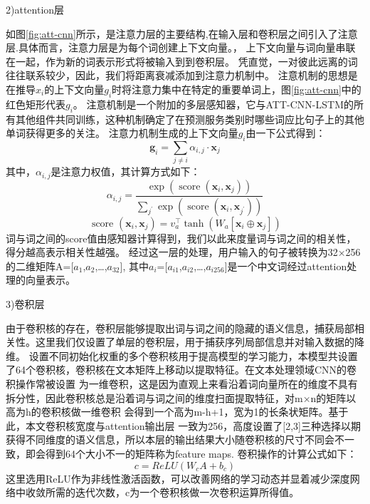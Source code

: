   2)attention层

  如图\ref{fig:att-cnn}所示，是注意力层的主要结构,在输入层和卷积层之间引入了注意层.具体而言，注意力层是为每个词创建上下文向量。，
  上下文向量与词向量串联在一起，作为新的词表示形式将被输入到到卷积层。 凭直觉，一对彼此远离的词往往联系较少，因此，我们将距离衰减添加到注意力机制中。 
  注意机制的思想是在推导$x_{i}$的上下文向量$g_{i}$时将注意力集中在特定的重要单词上，图\ref{fig:att-cnn}中的红色矩形代表$g_{i}$。 
  注意机制是一个附加的多层感知器，它与ATT-CNN-LSTM的所有其他组件共同训练，这种机制确定了在预测服务类别时哪些词应比句子上的其他单词获得更多的关注。
  注意力机制生成的上下文向量$g_{i}$由一下公式得到：
  \begin{equation}
  \mathbf{g}_{i}=\sum_{j \neq i} \alpha_{i, j} \cdot \mathbf{x}_{j}
\end{equation}
其中，$\alpha_{i, j}$是注意力权值，其计算方式如下：
\begin{equation}
\alpha_{i, j}=\frac{\exp \left(\operatorname{score}\left(\mathbf{x}_{i}, \mathbf{x}_{j}\right)\right)}{\sum_{j^{\prime}} \exp \left(\operatorname{score}\left(\mathbf{x}_{i}, \mathbf{x}_{j^{\prime}}\right)\right)}
\end{equation}
\begin{equation}
\text { score }\left(\mathbf{x}_{i}, \mathbf{x}_{j}\right)=v_{a}^{\top} \tanh \left(W_{a}\left[\mathbf{x}_{i} \oplus \mathbf{x}_{j}\right]\right)
\end{equation}
词与词之间的score值由感知器计算得到，我们以此来度量词与词之间的相关性，得分越高表示相关性越强。
经过这一层的处理，用户输入的句子被转换为32×256的二维矩阵A=[$a_{1}$,$a_{2}$,\dots,$a_{32}$],
其中$a_{i}$=[$a_{i1}$,$a_{i2}$,\dots,$a_{i256}$]是一个中文词经过attention处理的向量表示。

  3)卷积层

  由于卷积核的存在，卷积层能够提取出词与词之间的隐藏的语义信息，捕获局部相关性。这里我们仅设置了单层的卷积层，用于捕获序列局部信息并对输入数据的降维。
  设置不同初始化权重的多个卷积核用于提高模型的学习能力，本模型共设置了64个卷积核，卷积核在文本矩阵上移动以提取特征。在文本处理领域CNN的卷积操作常被设置
  为一维卷积，这是因为直观上来看沿着词向量所在的维度不具有拆分性，因此卷积核总是沿着词与词之间的维度扫面提取特征，对m×n的矩阵以高为h的卷积核做一维卷积
  会得到一个高为m-h+1，宽为1的长条状矩阵。基于此，本文卷积核宽度与attention输出层
  一致为256，高度设置了[2,3]三种选择以期获得不同维度的语义信息，所以本层的输出结果大小随卷积核的尺寸不同会不一致，即会得到64个大小不一的矩阵称为feature maps.
  卷积操作的计算公式如下：
  \begin{equation}
    c=ReLU(W_{c}A+b_{c})
    \end{equation}
    这里选用ReLU作为非线性激活函数，可以改善网络的学习动态并显着减少深度网络中收敛所需的迭代次数，c为一个卷积核做一次卷积运算所得值。

